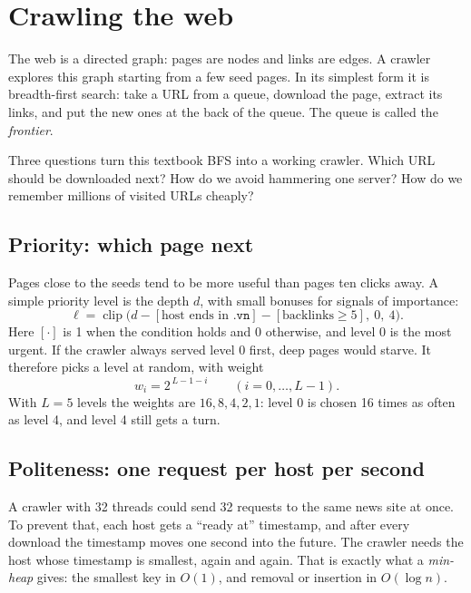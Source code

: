 \documentclass[9pt,twocolumn,a4paper]{extarticle}
\newcommand{\code}[1]{\texttt{#1}}
\begin{document}
\section{Crawling the web}
\label{sec:crawl}
The web is a directed graph: pages are nodes and links are edges. A crawler explores this graph starting from a few seed pages. In its simplest form it is breadth-first search: take a URL from a queue, download the page, extract its links, and put the new ones at the back of the queue. The queue is called the \emph{frontier}.

Three questions turn this textbook BFS into a working crawler. Which URL should be downloaded next? How do we avoid hammering one server? How do we remember millions of visited URLs cheaply?

\subsection{Priority: which page next}
Pages close to the seeds tend to be more useful than pages ten clicks away. A simple priority level is the depth $d$, with small bonuses for signals of importance:
\begin{equation}
\ell=\operatorname{clip}\big(d-[\text{host ends in }\code{.vn}]-[\text{backlinks}\ge5],\ 0,\ 4\big).
\label{eq:level}
\end{equation}
Here $[\cdot]$ is 1 when the condition holds and 0 otherwise, and level 0 is the most urgent. If the crawler always served level 0 first, deep pages would starve. It therefore picks a level at random, with weight
\begin{equation}
w_i=2^{\,L-1-i}\qquad(i=0,\dots,L-1).
\label{eq:weight}
\end{equation}
With $L=5$ levels the weights are $16,8,4,2,1$: level 0 is chosen 16 times as often as level 4, and level 4 still gets a turn.

\subsection{Politeness: one request per host per second}
A crawler with 32 threads could send 32 requests to the same news site at once. To prevent that, each host gets a ``ready at'' timestamp, and after every download the timestamp moves one second into the future. The crawler needs the host whose timestamp is smallest, again and again. That is exactly what a \emph{min-heap} gives: the smallest key in $O(1)$, and removal or insertion in $O(\log n)$.
\end{document}
